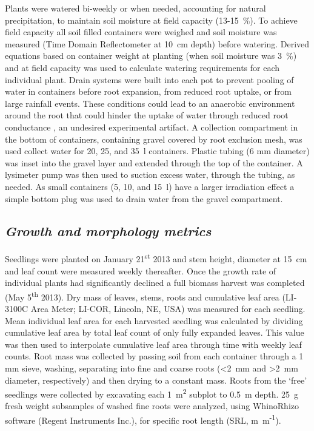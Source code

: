 \documentclass[a4paper]{article}\usepackage[]{graphicx}\usepackage[]{color}
\begin{document}
Plants were watered bi-weekly or when needed, accounting for natural precipitation, to maintain soil moisture at field capacity (13-15~\%). To achieve field capacity all soil filled containers were weighed and soil moisture was measured (Time Domain Reflectometer at 10~cm depth) before watering. Derived equations based on container weight at planting (when soil moisture was 3~\%) and at field capacity was used to calculate watering requirements for each individual plant. Drain systems were built into each pot to prevent pooling of water in containers before root expansion, from reduced root uptake, or from large rainfall events. These conditions could lead to an anaerobic environment around the root that could hinder the uptake of water through reduced root conductance \cite{poorter2009causes}, an undesired experimental artifact. A collection compartment in the bottom of containers, containing gravel covered by root exclusion mesh, was used collect water for 20, 25, and 35~l containers. Plastic tubing (6 mm diameter) was inset into the gravel layer and extended through the top of the container. A lysimeter pump was then used to suction excess water, through the tubing, as needed. As small containers (5, 10, and 15~l) have a larger irradiation effect a simple bottom plug was used to drain water from the gravel compartment.  

\subsection*{\textit{Growth and morphology metrics}}
Seedlings were planted on January 21\textsuperscript{st} 2013 and stem height, diameter at 15~cm and leaf count were measured weekly thereafter. Once the growth rate of individual plants had significantly declined a full biomass harvest was completed (May 5\textsuperscript{th} 2013). Dry mass of leaves, stems, roots and cumulative leaf area (LI-3100C Area Meter; LI-COR, Lincoln, NE, USA) was measured for each seedling. Mean individual leaf area for each harvested seedling was calculated by dividing cumulative leaf area by total leaf count of only fully expanded leaves. This value was then used to interpolate cumulative leaf area through time with weekly leaf counts. Root mass was collected by passing soil from each container through a 1 mm sieve, washing, separating into fine and coarse roots (\textless2~mm and \textgreater2~mm diameter, respectively) and then drying to a constant mass. Roots from the ‘free’ seedlings were collected by excavating each 1~m\textsuperscript{2} subplot to 0.5~m depth.  25~g fresh weight subsamples of washed fine roots were analyzed, using WhinoRhizo software (Regent Instruments Inc.), for specific root length (SRL, m~m\textsuperscript{-1}).
\end{document}
